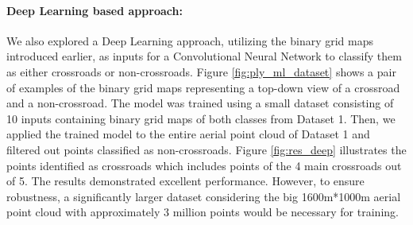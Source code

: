 \documentclass[11pt]{article}
\begin{document}
    \paragraph{Deep Learning based approach:}
    We also explored a Deep Learning approach, utilizing the binary grid maps introduced earlier, as inputs for a
    Convolutional Neural Network to classify them as either crossroads or non-crossroads. Figure \ref{fig:ply_ml_dataset}
    shows a pair of examples of the binary grid maps representing a top-down view of a crossroad and a non-crossroad.
    The model was trained using a small dataset consisting of 10 inputs containing binary grid maps of both classes
    from Dataset 1. Then, we applied the trained model to the entire aerial point cloud of Dataset 1 and filtered out
    points classified as non-crossroads. Figure \ref{fig:res_deep} illustrates the points identified
    as crossroads which includes points of the 4 main crossroads out of 5. The results demonstrated excellent performance.
    However, to ensure robustness, a significantly larger dataset considering the big 1600m*1000m aerial point cloud
    with approximately 3 million points would be necessary for training.
\end{document}
